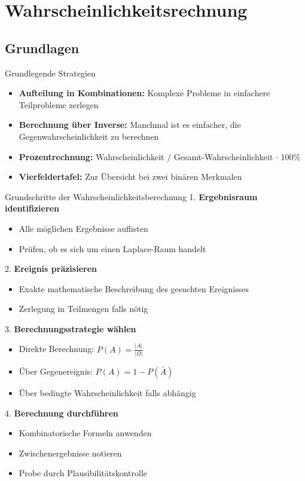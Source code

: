 \section{Wahrscheinlichkeitsrechnung}

\subsection{Grundlagen}

\begin{concept}{Grundlegende Strategien}
\begin{itemize}
    \item \textbf{Aufteilung in Kombinationen:} Komplexe Probleme in einfachere Teilprobleme zerlegen
    \item \textbf{Berechnung über Inverse:} Manchmal ist es einfacher, die Gegenwahrscheinlichkeit zu berechnen
    \item \textbf{Prozentrechnung:} Wahrscheinlichkeit / Gesamt-Wahrscheinlichkeit $\cdot$ 100\%
    \item \textbf{Vierfeldertafel:} Zur Übersicht bei zwei binären Merkmalen
\end{itemize}
\end{concept}

\begin{KR}{Grundschritte der Wahrscheinlichkeitsberechnung}
1. \textbf{Ergebnisraum identifizieren}
   \begin{itemize}
   \item Alle möglichen Ergebnisse auflisten
   \item Prüfen, ob es sich um einen Laplace-Raum handelt
   \end{itemize}

2. \textbf{Ereignis präzisieren}
   \begin{itemize}
   \item Exakte mathematische Beschreibung des gesuchten Ereignisses
   \item Zerlegung in Teilmengen falls nötig
   \end{itemize}

3. \textbf{Berechnungsstrategie wählen}
   \begin{itemize}
   \item Direkte Berechnung: $P(A) = \frac{|A|}{|\Omega|}$
   \item Über Gegenereignis: $P(A) = 1 - P(\bar{A})$
   \item Über bedingte Wahrscheinlichkeit falls abhängig
   \end{itemize}

4. \textbf{Berechnung durchführen}
   \begin{itemize}
   \item Kombinatorische Formeln anwenden
   \item Zwischenergebnisse notieren
   \item Probe durch Plausibilitätskontrolle
   \end{itemize}
\end{KR}


